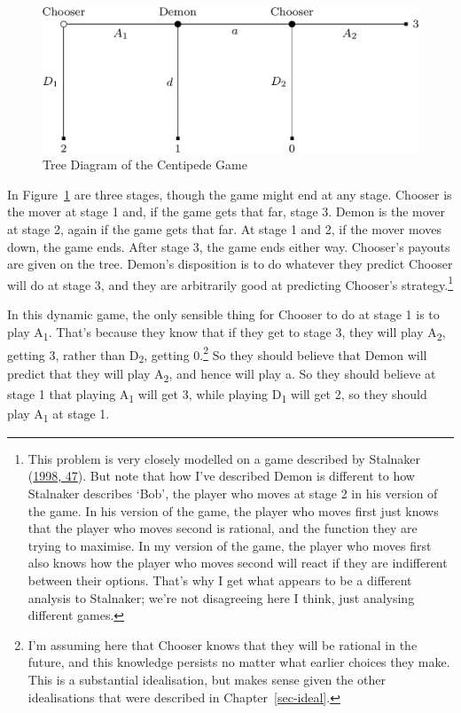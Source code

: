 \documentclass[
  12pt,
  letterpaper,
  DIV=11,
  numbers=noendperiod]{scrreprt}
\begin{document}
\begin{figure}

{\centering \includegraphics{dual_files/figure-pdf/fig-stalnaker-centipede-1.png}

}

\caption{\label{fig-stalnaker-centipede}Tree Diagram of the Centipede
Game}

\end{figure}

In Figure~\ref{fig-stalnaker-centipede} are three stages, though the
game might end at any stage. Chooser is the mover at stage 1 and, if the
game gets that far, stage 3. Demon is the mover at stage 2, again if the
game gets that far. At stage 1 and 2, if the mover moves down, the game
ends. After stage 3, the game ends either way. Chooser's payouts are
given on the tree. Demon's disposition is to do whatever they predict
Chooser will do at stage 3, and they are arbitrarily good at predicting
Chooser's strategy.\footnote{This problem is very closely modelled on a
  game described by Stalnaker
  (\protect\hyperlink{ref-Stalnaker1998}{1998, 47}). But note that how
  I've described Demon is different to how Stalnaker describes `Bob',
  the player who moves at stage 2 in his version of the game. In his
  version of the game, the player who moves first just knows that the
  player who moves second is rational, and the function they are trying
  to maximise. In my version of the game, the player who moves first
  also knows how the player who moves second will react if they are
  indifferent between their options. That's why I get what appears to be
  a different analysis to Stalnaker; we're not disagreeing here I think,
  just analysing different games.}

In this dynamic game, the only sensible thing for Chooser to do at stage
1 is to play A\textsubscript{1}. That's because they know that if they
get to stage 3, they will play A\textsubscript{2}, getting 3, rather
than D\textsubscript{2}, getting 0.\footnote{I'm assuming here that
  Chooser knows that they will be rational in the future, and this
  knowledge persists no matter what earlier choices they make. This is a
  substantial idealisation, but makes sense given the other
  idealisations that were described in Chapter~\ref{sec-ideal}.} So they
should believe that Demon will predict that they will play
A\textsubscript{2}, and hence will play a. So they should believe at
stage 1 that playing A\textsubscript{1} will get 3, while playing
D\textsubscript{1} will get 2, so they should play A\textsubscript{1} at
stage 1.
\end{document}
